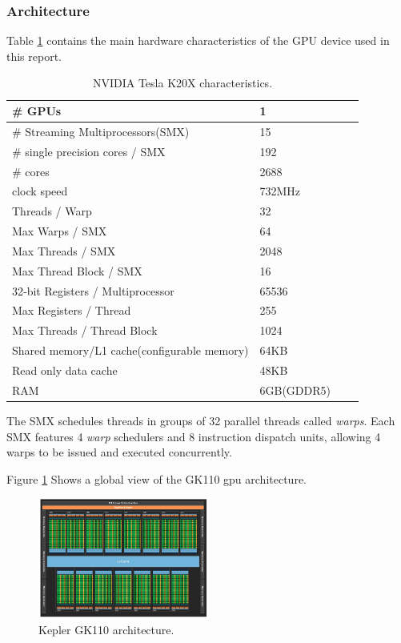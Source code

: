 \subsubsection{Architecture}

\par{Table \ref{tab:gpu_arch} contains the main hardware characteristics of the GPU device used in this report.}

\begin{table}[!h]
    \centering
    \begin{tabular}{| l | l | l | l |}
    \hline
    \# GPUs & 1 \\ \hline
    \# Streaming Multiprocessors(SMX) & 15 \\ \hline
    \# single precision cores / SMX & 192 \\ \hline
    \# cores & 2688 \\ \hline
    clock speed & 732MHz \\ \hline
    Threads / Warp & 32 \\ \hline
    Max Warps / SMX & 64 \\ \hline
    Max Threads / SMX & 2048 \\ \hline
    Max Thread Block / SMX & 16 \\ \hline
    32‐bit Registers / Multiprocessor & 65536 \\ \hline
    Max Registers / Thread & 255 \\ \hline
    Max Threads / Thread Block& 1024 \\ \hline
    Shared memory/L1 cache(configurable memory) & 64KB \\ \hline
    Read only data cache & 48KB \\ \hline
    RAM & 6GB(GDDR5) \\ \hline
    \end{tabular}
    \caption{NVIDIA Tesla K20X characteristics\cite{gpu_specs1}.}
    \label{tab:gpu_arch}
\end{table}

\par{The SMX schedules threads in groups of 32 parallel threads called \emph{warps}. Each SMX features 4 \emph{warp}
    schedulers and 8 instruction dispatch units, allowing 4 warps to be issued and executed concurrently\cite{gpu_specs1}.}

\par{Figure \ref{GpuArch} Shows a global view of the GK110 gpu architecture.}

\begin{figure}[!h]
    \centering
    \includegraphics[width=0.5\textwidth]{figures/gpu_arch.png}
    \caption{Kepler GK110 architecture\cite{gpu_specs1}.}
    \label{GpuArch}
\end{figure}

